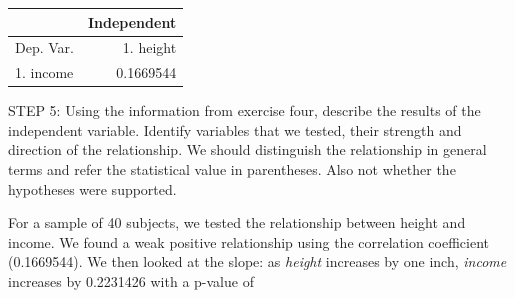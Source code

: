 \documentclass[11pt, chapterprefix=true]{scrbook}\usepackage[]{graphicx}\usepackage[]{color}
\begin{document}
\begin{exercises}
\begin{exercise}
{{\begin{table}[ht]
\begin{tabular}{lr}
    \end{tabular}
    \end{table}
}}

  \vspace{5mm}

    \end{exercise}
    \vspace{2mm}
    \begin{solution}

       \begin{table}[ht]
    \centering
    \begin{tabular}{lr} \hline
        &  \multicolumn{1}{c}{Independent} \\ \hline

    Dep. Var. & 1. height      \\ \hline
    1. income  &   0.1669544      \\ \hline

    \end{tabular}
    \end{table}


    \end{solution}

      \begin{exercise} %


    STEP 5: Using the information from exercise four, describe the results of the independent variable.  Identify variables that we tested, their strength and direction of the relationship.  We should distinguish the relationship in general terms and refer the statistical value in parentheses.  Also not whether the hypotheses were supported.

    \vspace{10mm}

    \end{exercise}
    \vspace{2mm}
    \begin{solution}

    For a sample of 40 subjects, we tested the relationship between height and income.  We found a weak positive relationship using the correlation coefficient (0.1669544).  We then looked at the slope:  as {\textit{height}} increases by one inch, {\textit{income}} increases by 0.2231426 with a p-value of


    \end{solution}

  \begin{exercise} %



\end{exercise}
\end{exercises}
\end{document}
